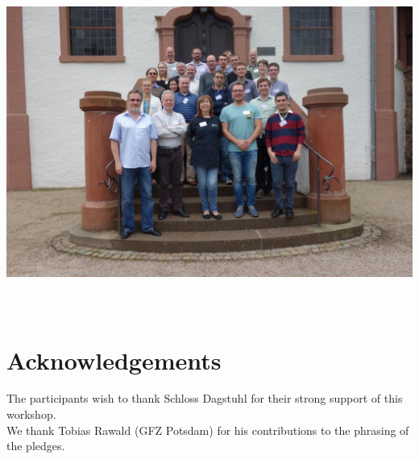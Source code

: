 \documentclass[a4paper,UKenglish]{dagman}
\begin{document}
\begin{center}
  \includegraphics[height=11cm]{picture-16252.jpg}
\end{center}

\section*{Acknowledgements}

The participants wish to thank Schloss Dagstuhl for their strong support of this workshop. \\
We thank Tobias Rawald (GFZ Potsdam) for his contributions to the phrasing of the pledges.


% 




\end{document}
